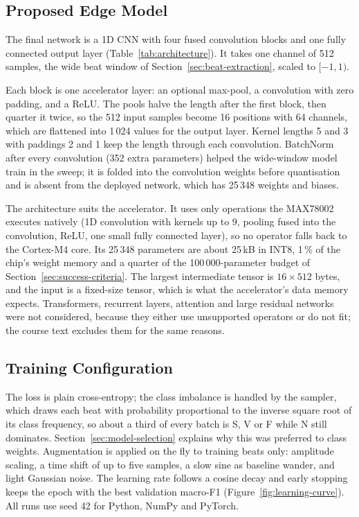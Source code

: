 \subsection{Proposed Edge Model}
\label{sec:edge-model}

The final network is a 1D CNN with four fused convolution blocks and one fully connected output layer (Table~\ref{tab:architecture}). It takes one channel of 512 samples, the wide beat window of Section~\ref{sec:beat-extraction}, scaled to $[-1, 1)$.



Each block is one accelerator layer: an optional max-pool, a convolution with zero padding, and a ReLU. The pools halve the length after the first block, then quarter it twice, so the 512 input samples become 16 positions with 64 channels, which are flattened into 1\,024 values for the output layer. Kernel lengths 5 and 3 with paddings 2 and 1 keep the length through each convolution. BatchNorm after every convolution (352 extra parameters) helped the wide-window model train in the sweep; it is folded into the convolution weights before quantisation and is absent from the deployed network, which has 25\,348 weights and biases.

The architecture suits the accelerator. It uses only operations the MAX78002 executes natively (1D convolution with kernels up to 9, pooling fused into the convolution, ReLU, one small fully connected layer), so no operator falls back to the Cortex-M4 core. Its 25\,348 parameters are about 25\,kB in INT8, 1\,\% of the chip's weight memory and a quarter of the 100\,000-parameter budget of Section~\ref{sec:success-criteria}. The largest intermediate tensor is $16 \times 512$ bytes, and the input is a fixed-size tensor, which is what the accelerator's data memory expects. Transformers, recurrent layers, attention and large residual networks were not considered, because they either use unsupported operators or do not fit; the course text excludes them for the same reasons.

\subsection{Training Configuration}
\label{sec:training-config}



The loss is plain cross-entropy; the class imbalance is handled by the sampler, which draws each beat with probability proportional to the inverse square root of its class frequency, so about a third of every batch is S, V or F while N still dominates. Section~\ref{sec:model-selection} explains why this was preferred to class weights. Augmentation is applied on the fly to training beats only: amplitude scaling, a time shift of up to five samples, a slow sine as baseline wander, and light Gaussian noise. The learning rate follows a cosine decay and early stopping keeps the epoch with the best validation macro-F1 (Figure~\ref{fig:learning-curve}). All runs use seed 42 for Python, NumPy and PyTorch.


